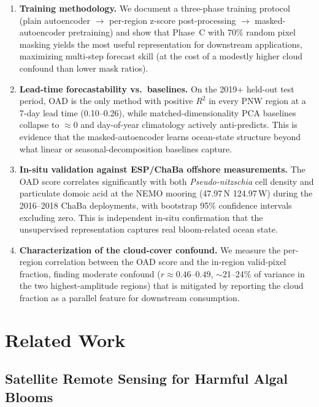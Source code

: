 \documentclass[toxins,article,submit,moreauthors]{Definitions/mdpi}
\begin{document}
\begin{enumerate}[nosep]
    \item \textbf{Training methodology.} We document a three-phase training protocol (plain autoencoder $\to$ per-region z-score post-processing $\to$ masked-autoencoder pretraining) and show that Phase~C with 70\% random pixel masking yields the most useful representation for downstream applications, maximizing multi-step forecast skill (at the cost of a modestly higher cloud confound than lower mask ratios).
    \item \textbf{Lead-time forecastability vs.\ baselines.} On the 2019+ held-out test period, OAD is the only method with positive $R^2$ in every PNW region at a 7-day lead time (0.10--0.26), while matched-dimensionality PCA baselines collapse to $\approx 0$ and day-of-year climatology actively anti-predicts. This is evidence that the masked-autoencoder learns ocean-state structure beyond what linear or seasonal-decomposition baselines capture.
    \item \textbf{In-situ validation against ESP/ChaBa offshore measurements.} The OAD score correlates significantly with both \textit{Pseudo-nitzschia} cell density and particulate domoic acid at the NEMO mooring (47.97\textdegree\,N 124.97\textdegree\,W) during the 2016--2018 ChaBa deployments, with bootstrap 95\% confidence intervals excluding zero. This is independent in-situ confirmation that the unsupervised representation captures real bloom-related ocean state.
    \item \textbf{Characterization of the cloud-cover confound.} We measure the per-region correlation between the OAD score and the in-region valid-pixel fraction, finding moderate confound ($r \approx 0.46$--$0.49$, $\sim$21--24\% of variance in the two highest-amplitude regions) that is mitigated by reporting the cloud fraction as a parallel feature for downstream consumption.
\end{enumerate}

\section{Related Work}
\label{sec:related}

\subsection{Satellite Remote Sensing for Harmful Algal Blooms}
\end{document}
